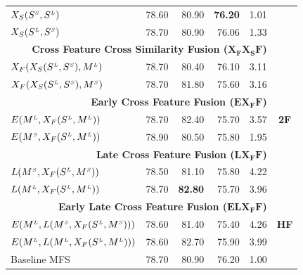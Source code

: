 \begin{table}[htp!]
\begin{tabular}{@{}lrrrrc@{}}
 
	   $X_S(S^{\scriptscriptstyle S}, S^{\scriptscriptstyle L})$		& 78.60 & 80.90 & \textbf{76.20}  & 1.01\\
	   $X_S(S^{\scriptscriptstyle L}, S^{\scriptscriptstyle S})$		& 78.70 & 80.90	& 76.06 & 1.33\\
	  
 \midrule
                   \multicolumn{5}{r}{\textbf{Cross Feature Cross Similarity Fusion ($\mathbf{X_FX_SF}$)}}  & \multirow{9}{*}{\textbf{2F}}     \\ %
	   
       $X_F(X_S(S^{\scriptscriptstyle L}, S^{\scriptscriptstyle S}), M^{\scriptscriptstyle L})$		& 78.70 & 80.40 & 76.10 & 3.11 \\	   
       $X_F(X_S(S^{\scriptscriptstyle L}, S^{\scriptscriptstyle S}), M^{\scriptscriptstyle S})$		& 78.70 & 81.80 & 75.60 & 3.16\\	   
                   \multicolumn{5}{r}{\textbf{Early Cross Feature Fusion ($\mathbf{EX_FF}$)}}       \\ %
       
       $E(M^{\scriptscriptstyle L}, X_F(S^{\scriptscriptstyle L}, M^{\scriptscriptstyle L}))$		&78.70 & 82.40 & 75.70 & 3.57\\	   
	   $E(M^{\scriptscriptstyle S}, X_F(S^{\scriptscriptstyle L}, M^{\scriptscriptstyle L}))$		& 78.90 & 80.50 & 75.80 & 1.95\\	   
                   \multicolumn{5}{r}{\textbf{Late Cross Feature Fusion ($\mathbf{LX_FF}$)}}       \\ %
	   $L(M^{\scriptscriptstyle S}, X_F(S^{\scriptscriptstyle L}, M^{\scriptscriptstyle S}))$		& 78.50 & 81.10 & 75.80 & 4.22\\	   
	   $L(M^{\scriptscriptstyle L}, X_F(S^{\scriptscriptstyle L}, M^{\scriptscriptstyle L}))$		& 78.70 & \textbf{82.80} & 75.70 & 3.96\\	   
       \midrule
                   \multicolumn{5}{r}{\textbf{Early Late Cross Feature Fusion ($\mathbf{ELX_FF}$)}}     & \multirow{3}{*}{\textbf{HF}}  \\ %
	   $E(M^{\scriptscriptstyle L}, L(M^{\scriptscriptstyle S}, X_F(S^{\scriptscriptstyle L}, M^{\scriptscriptstyle S})))$		& 78.60 & 81.40 & 75.40 & 4.26\\	   
	   $E(M^{\scriptscriptstyle L}, L(M^{\scriptscriptstyle L}, X_F(S^{\scriptscriptstyle L}, M^{\scriptscriptstyle L})))$		& 78.60 & 82.70 & 75.90 & 3.99\\
	   \midrule
	   \midrule
	   

	   Baseline MFS		& 78.70 & 80.90 & 76.20 & 1.00\\ 	   	 	    
       \bottomrule
\end{tabular}
\end{table}




